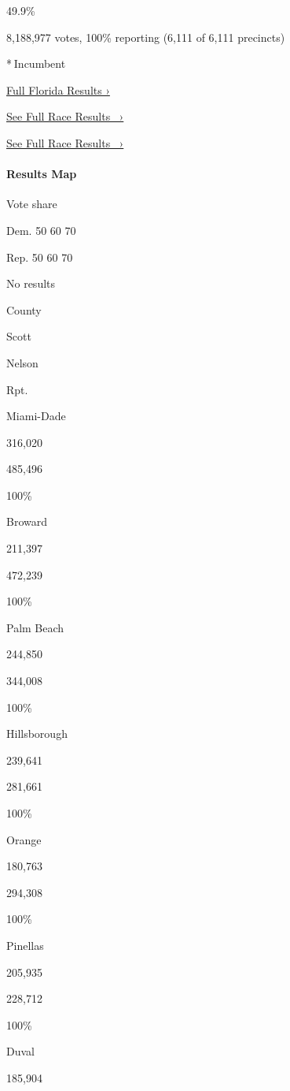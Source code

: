 49.9\%

8,188,977 votes, 100\% reporting (6,111 of 6,111 precincts)

* Incumbent

\href{https://www.nytimes3xbfgragh.onion/interactive/2018/11/06/us/elections/results-florida-elections.html}{Full
Florida Results ›}

\href{https://www.nytimes3xbfgragh.onion/elections/results/florida-senate}{See
Full Race Results~ ›}

\href{https://www.nytimes3xbfgragh.onion/elections/results/florida-senate}{See
Full Race Results~ ›}

\hypertarget{results-map-1}{%
\paragraph{Results Map}\label{results-map-1}}

Vote share

Dem. 50 60 70

Rep. 50 60 70

No results

County

Scott

Nelson

Rpt.

Miami-Dade

316,020

485,496

100\%

Broward

211,397

472,239

100\%

Palm Beach

244,850

344,008

100\%

Hillsborough

239,641

281,661

100\%

Orange

180,763

294,308

100\%

Pinellas

205,935

228,712

100\%

Duval

185,904

